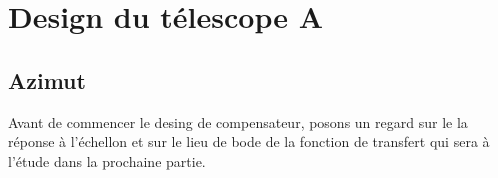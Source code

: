 \documentclass{udes_rapport} %
\begin{document}
\section{Design du télescope A}
\subsection{Azimut}
Avant de commencer le desing de compensateur, posons un regard sur le la réponse à l'échellon et sur le lieu de bode de la fonction de transfert qui sera à l'étude dans la prochaine partie.\\
\end{document}
